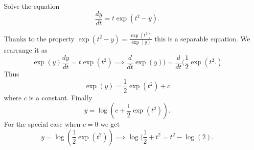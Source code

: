\begin{example}
Solve the equation $$\frac{dy}{dt} = t\exp(t^2-y).$$
\begin{solution}
Thanks to the property $\exp(t^2-y) = \frac{\exp(t^2)}{\exp(y)}$ this is a separable equation. We rearrange it as $$\exp(y)\frac{dy}{dt} = t\exp(t^2) \implies \frac{d}{dt}\exp(y)) = \frac{d}{dt}(\frac{1}{2} \exp(t^2.)$$
Thus $$\exp(y) = \frac{1}{2} \exp(t^2) + c$$ where $c$ is a constant. Finally $$y = \log(c + \frac{1}{2} \exp(t^2)).$$ For the special case when $c = 0$ we get $$y = \log(\frac{1}{2} \exp(t^2)) \implies \log(\frac{1}{2}+t^2 = t^2 - \log(2).$$
\end{solution}
\end{example}


\endinput
